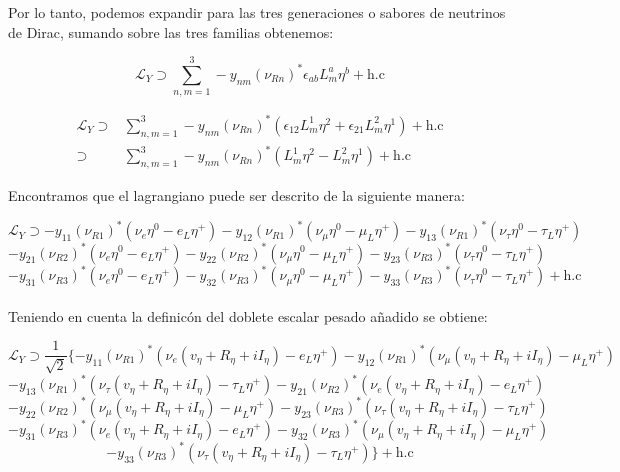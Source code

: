 \documentclass[12pt]{article}
\begin{document}
Por lo tanto, podemos expandir para las tres generaciones o sabores de neutrinos de Dirac, sumando sobre las tres familias obtenemos: 

\begin{equation}
    \label{eq:SecondYu}
    \mathcal{L}_Y \supset  \sum_{n,m=1}^3 -y_{nm} (\nu_{Rn})^* \epsilon_{ab}{L}^a_m \eta^b+ \text{h.c}
\end{equation}

\begin{equation}
    \label{eq:Third}
    \begin{aligned}
    \mathcal{L}_Y \supset&  \sum_{n,m=1}^3 -y_{nm} (\nu_{Rn})^* (\epsilon_{12}{L}^1_m \eta^2+\epsilon_{21}{L}^2_m \eta^1)+ \text{h.c} \nonumber\\
     \supset &  \sum_{n,m=1}^3-y_{nm} (\nu_{Rn})^* ({L}^1_m \eta^2-{L}^2_m \eta^1)+ \text{h.c} \nonumber
    \end{aligned}
\end{equation}


Encontramos que el lagrangiano puede ser descrito de la siguiente manera:


 \begin{equation}
         \mathcal{L}_Y \supset -y_{11} (\nu_{R1})^* (\nu_e \eta^0-e_L \eta^+) -y_{12} (\nu_{R1})^* (\nu_\mu \eta^0-\mu_L \eta^+) -y_{13} (\nu_{R1})^* (\nu_\tau \eta^0-\tau_L \eta^+)      
    \end{equation}
\[ -y_{21} (\nu_{R2})^* (\nu_e \eta^0-e_L \eta^+)-y_{22} (\nu_{R2})^* (\nu_\mu \eta^0-\mu_L \eta^+) -y_{23} (\nu_{R3})^* (\nu_\tau \eta^0-\tau_L \eta^+) \]
    \[   -y_{31} (\nu_{R3})^* (\nu_e \eta^0-e_L \eta^+)-y_{32} (\nu_{R3})^* (\nu_\mu \eta^0-\mu_L \eta^+)-y_{33} (\nu_{R3})^* (\nu_\tau \eta^0-\tau_L \eta^+) +\text{h.c} \] \\

Teniendo en cuenta la definicón del doblete escalar pesado añadido se obtiene:

\begin{equation}
         \mathcal{L}_Y \supset \frac{1}{\sqrt{2}} \{-y_{11} (\nu_{R1})^* (\nu_e (v_\eta+R_\eta+i I_\eta)-e_L \eta^+) -y_{12} (\nu_{R1})^* (\nu_\mu (v_\eta+R_\eta+i I_\eta)-\mu_L \eta^+)       
    \end{equation}
\[ -y_{13} (\nu_{R1})^* (\nu_\tau (v_\eta+R_\eta+i I_\eta)-\tau_L \eta^+)-y_{21} (\nu_{R2})^* (\nu_e (v_\eta+R_\eta+i I_\eta)-e_L \eta^+)\] 
\[-y_{22} (\nu_{R2})^* (\nu_\mu (v_\eta+R_\eta+i I_\eta)-\mu_L \eta^+) -y_{23} (\nu_{R3})^* (\nu_\tau (v_\eta+R_\eta+i I_\eta)-\tau_L \eta^+) \]
\[   -y_{31} (\nu_{R3})^* (\nu_e (v_\eta+R_\eta+i I_\eta)-e_L \eta^+)-y_{32} (\nu_{R3})^* (\nu_\mu (v_\eta+R_\eta+i I_\eta)-\mu_L \eta^+) \] 
\[  -y_{33} (\nu_{R3})^* (\nu_\tau (v_\eta+R_\eta+i I_\eta)-\tau_L \eta^+)  \} +\text{h.c} \] \\
  
\end{document}
